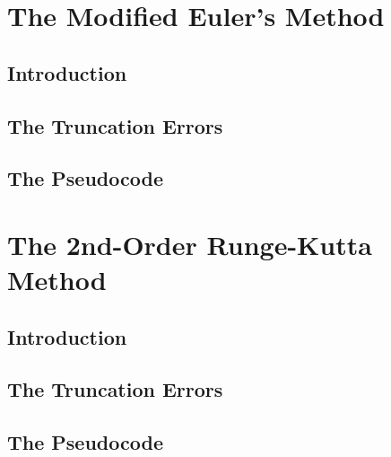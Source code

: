 \documentclass[12pt,oneside]{book}
\begin{document}
	\clearpage
	\section{The Modified Euler's Method} \label{m:meul}
		\begin{spacing}{1.2}
			
			\subsection{Introduction}
			
			
			\subsection{The Truncation Errors}
			
			
			\subsection{The Pseudocode}
			
		\end{spacing}
		
	\clearpage
	\section{The 2nd-Order Runge-Kutta Method} \label{m:rk2}
		\begin{spacing}{1.2}
			
			\subsection{Introduction}
			
			
			\subsection{The Truncation Errors}
			
			
			\subsection{The Pseudocode}
			
		\end{spacing}
		
		\clearpage
\end{document}
